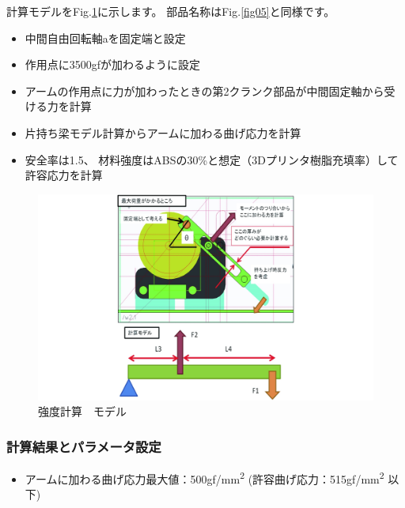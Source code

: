 計算モデルをFig.\ref{fig08}に示します。
部品名称はFig.\ref{fig05}と同様です。

\begin{itemize}
\tightlist
\item
  中間自由回転軸aを固定端と設定
\item
  作用点に3500gfが加わるように設定
\item
  アームの作用点に力が加わったときの第2クランク部品が中間固定軸から受ける力を計算
\item
  片持ち梁モデル計算からアームに加わる曲げ応力を計算
\item
  安全率は1.5、
  材料強度はABSの30\%と想定（3Dプリンタ樹脂充填率）して許容応力を計算
\end{itemize}

\begin{figure}[htbp]
\centering
\includegraphics[width=450pt]{fig/fig08_cmyk.jpg}
\caption{強度計算　モデル}
\label{fig08}
\end{figure}

\clearpage

\subsubsection{計算結果とパラメータ設定}\label{ux8a08ux7b97ux7d50ux679cux3068ux30d1ux30e9ux30e1ux30fcux30bfux8a2dux5b9a}

\begin{itemize}
\tightlist
\item
  アームに加わる曲げ応力最大値：500gf/mm\textsuperscript{2}
  (許容曲げ応力：515gf/mm\textsuperscript{2} 以下)
\end{itemize}

